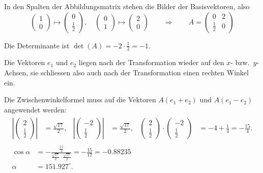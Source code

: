 \begin{loesung}
In den Spalten der Abbildungsmatrix stehen die Bilder der Basisvektoren, also
\[
\begin{pmatrix}1\\0\end{pmatrix}\mapsto\begin{pmatrix}0\\\frac12\end{pmatrix}
,\quad
\begin{pmatrix}0\\1\end{pmatrix}\mapsto\begin{pmatrix}2\\0\end{pmatrix}
\qquad
\Rightarrow\qquad
A=\begin{pmatrix}
0&2\\
\frac12&0
\end{pmatrix}
\]
\begin{teilaufgaben}
\item
Die Determinante ist $\det(A)=-2\cdot\frac12=-1.$
\item
Die Vektoren $e_1$ und $e_2$ liegen nach der Transformation wieder auf
den $x$- bzw.~$y$-Achsen, sie schliessen also auch nach der Transformation
einen rechten Winkel ein.
\item
Die Zwischenwinkelformel muss auf die Vektoren $A(e_1+e_2)$ und
$A(e_1-e_2)$ angewendet werden:
\begin{gather}
\begin{aligned}
\left|\begin{pmatrix}2\\\frac12\end{pmatrix}\right|&=\frac{\sqrt{17}}2,&
\left|\begin{pmatrix}-2\\\frac12\end{pmatrix}\right|&=\frac{\sqrt{17}}2,&
\begin{pmatrix}2\\\frac12\end{pmatrix}
\cdot
\begin{pmatrix}-2\\\frac12\end{pmatrix}
&=-4+\frac14=-\frac{15}4.
\end{aligned}
\\
\begin{aligned}
\cos\alpha&=-\frac{\frac{15}{4}}{\frac{\sqrt{17}}{2}\cdot\frac{\sqrt{17}}2}
=-\frac{15}{17}=-0.88235\\
\alpha&=151.927^\circ.
\end{aligned}
\end{gather}
\qedhere
\end{teilaufgaben}
\end{loesung}

